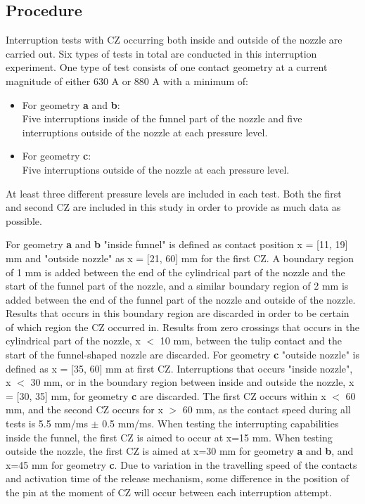 \documentclass[10pt,b5paper,twoside]{article}
\begin{document}
\subsection{Procedure} \label{sec:procedure}
Interruption tests with CZ occurring both inside and outside of the nozzle are carried out. Six types of tests in total are conducted in this interruption experiment. One type of test consists of one contact geometry at a current magnitude of either 630 A or 880 A with a minimum of:
\begin{itemize}
\item For geometry \textbf{a} and \textbf{b}: \\
Five interruptions inside of the funnel part of the nozzle and five interruptions outside of the nozzle at each pressure level.

\item For geometry \textbf{c}: \\
Five interruptions outside of the nozzle at each pressure level.

\end{itemize}
At least three different pressure levels are included in each test. Both the first and second CZ are included in this study in order to provide as much data as possible.

For geometry \textbf{a} and \textbf{b} "inside funnel" is defined as contact position x = [11, 19] mm and "outside nozzle" as x = [21, 60] mm for the first CZ. A boundary region of 1 mm is added between the end of the cylindrical part of the nozzle and the start of the funnel part of the nozzle, and a similar boundary region of 2 mm is added between the end of the funnel part of the nozzle and outside of the nozzle. Results that occurs in this boundary region are discarded in order to be certain of which region the CZ occurred in. Results from zero crossings that occurs in the cylindrical part of the nozzle, x $<$ 10 mm, between the tulip contact and the start of the funnel-shaped nozzle are discarded. For geometry \textbf{c} "outside nozzle" is defined as x = [35, 60] mm at first CZ. Interruptions that occurs "inside nozzle", x $<$ 30 mm, or in the boundary region between inside and outside the nozzle, x = [30, 35] mm, for geometry \textbf{c} are discarded. The first CZ occurs within x $<$ 60 mm, and the second CZ occurs for x $>$ 60 mm, as the contact speed during all tests is 5.5 mm/ms $\pm$ 0.5 mm/ms. When testing the interrupting capabilities inside the funnel, the first CZ is aimed to occur at x=15 mm. When testing outside the nozzle, the first CZ is aimed at x=30 mm for geometry \textbf{a} and \textbf{b}, and x=45 mm for geometry \textbf{c}. Due to variation in the travelling speed of the contacts and activation time of the release mechanism, some difference in the position of the pin at the moment of CZ will occur between each interruption attempt.
\end{document}
